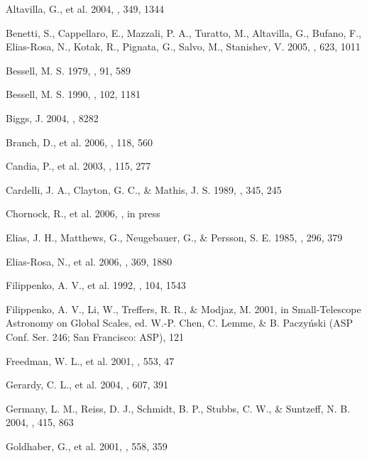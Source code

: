 \documentclass[12pt,preprint,psfig,epsf]{aastex}
\begin{document}
\begin{thebibliography}{}


 Altavilla, G., et al. 2004,
\mnras, 349, 1344

 Benetti, S., Cappellaro, E.,
 Mazzali, P. A., Turatto, M., Altavilla, G., Bufano, F.,
Elias-Rosa, N., Kotak, R., Pignata, G., Salvo, M., Stanishev, V. 2005,  
\apj, 623, 1011

 Bessell, M. S. 1979, \pasp, 91, 589

 Bessell, M. S. 1990, \pasp, 102, 1181

 Biggs, J. 2004, \iaucirc, 8282

 Branch, D., et al. 2006, \pasp, 118, 560

 Candia, P., et al. 2003, 
\pasp, 115, 277

 Cardelli, J. A., Clayton,
G. C., \& Mathis, J. S. 1989, \apj, 345, 245

 Chornock, R., et al. 2006,
\apj, in press

 Elias, J. H., Matthews, G.,
Neugebauer, G., \& Persson, S. E. 1985, \apj, 296, 379

 Elias-Rosa, N., et al. 2006,
\mnras, 369, 1880

 Filippenko, A. V., et al. 1992,
\aj, 104, 1543

 Filippenko, A. V., Li, W., Treffers,
R. R., \& Modjaz, M. 2001, in Small-Telescope Astronomy on Global Scales,
ed. W.-P. Chen, C. Lemme, \& B. Paczy\'{n}ski (ASP Conf. Ser. 246; San
Francisco: ASP), 121

 Freedman, W. L., et al. 2001, \apj,
553, 47

 Gerardy, C. L., et al. 2004, \apj,
607, 391

 Germany, L. M., Reiss, D. J.,
Schmidt, B. P., Stubbs, C. W., \& Suntzeff, N. B. 2004, \aap, 415, 863

 Goldhaber, G., et al. 
2001, \apj, 558, 359


\end{thebibliography}
\end{document}
